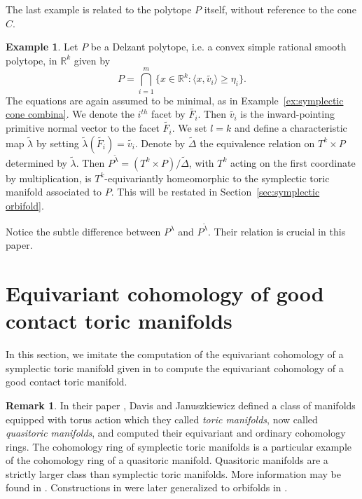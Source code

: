\documentclass[12pt]{amsart}
\def\R {{\mathbb{R}}}
\theoremstyle{definition}
\newtheorem{example}[theorem]{Example}
\newtheorem{remark}[theorem]{Remark}
\numberwithin{equation}{section}
\begin{document}
The last example is related to the polytope $P$ itself, without
reference to the cone $C$.
\begin{example}\label{ex:sym orb combinatorics}
Let $P$ be a Delzant polytope, i.e. a convex simple rational smooth
polytope, in $\R^{k}$ given by
\begin{equation}\label{eq:simple polytope}
P = \bigcap_{i=1}^{m}\{x\in \R^k: \langle x, \tilde{v_{i}}\rangle
\geq \eta_{i}\}.\end{equation} The equations are again assumed to be
minimal, as in Example~\ref{ex:symplectic cone combina}. We denote
the $i^{th}$ facet by $\tilde{F_{i}}$. Then $\tilde{v_{i}}$ is the
inward-pointing primitive normal vector to the facet
$\tilde{F_{i}}$. We set $l=k$ and define a characteristic map
$\tilde{\lambda}$ by setting $\tilde{\lambda}(\tilde{F_{i}})=
\tilde{v_{i}}$. Denote by $\tilde{\Delta}$ the equivalence relation
on $T^k\times P$ determined by $\tilde{\lambda}$. Then
$P^{\tilde{\lambda}}=(T^k\times P)/\tilde{\Delta}$, with $T^k$
acting on the first coordinate by multiplication, is
$T^{k}$-equivariantly homeomorphic to the symplectic toric manifold
associated to $P$. This will be restated in
Section~\ref{sec:symplectic orbifold}.
\end{example}
Notice the subtle difference between $P^{\lambda}$ and
$P^{\tilde{\lambda}}$. Their relation is crucial in this paper.


\section{\bf Equivariant cohomology of good contact toric manifolds}\label{sec:equi contact}
In this section, we imitate the computation of the equivariant
cohomology of a symplectic toric manifold given in \cite{DJ} to
compute the equivariant cohomology of a good contact toric manifold.

\begin{remark}
In their paper \cite{DJ}, Davis and Januszkiewicz defined a class of
manifolds equipped with torus action which they called {\em toric
manifolds}, now called {\em quasitoric manifolds}, and computed
their equivariant and ordinary cohomology rings. The cohomology ring
of symplectic toric manifolds is a particular example of the
cohomology ring of a quasitoric manifold. Quasitoric manifolds are a
strictly larger class than symplectic toric manifolds. More
information may be found in \cite{GP:quasitoric}. Constructions in
\cite{DJ} were later generalized to orbifolds in \cite{PS:quasitoric
orbifolds}.
\end{remark}
\end{document}
